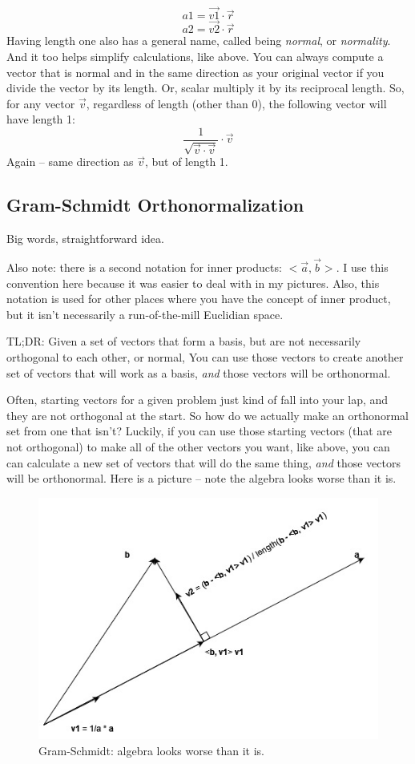 \documentclass[
]{book}
\begin{document}
\[a1 = \vec{v1}\cdot\vec{r}\]
\[a2 = \vec{v2}\cdot\vec{r}\]
Having length one also has a general name, called being \emph{normal}, or \emph{normality}. And it too helps simplify calculations, like above. You can always compute a vector that is normal and in the same direction as your original vector if you divide the vector by its length. Or, scalar multiply it by its reciprocal length. So, for any vector \(\vec{v}\), regardless of length (other than 0), the following vector will have length 1:
\[\frac{1}{\sqrt{\vec{v}\cdot\vec{v}}}\cdot\vec{v}\]
Again -- same direction as \(\vec{v}\), but of length 1.

\hypertarget{gram-schmidt-orthonormalization}{%
\subsection{Gram-Schmidt Orthonormalization}\label{gram-schmidt-orthonormalization}}

Big words, straightforward idea.

Also note: there is a second notation for inner products: \(<\vec{a},\vec{b}>\). I use this convention here because it was easier to deal with in my pictures. Also, this notation is used for other places where you have the concept of inner product, but it isn't necessarily a run-of-the-mill Euclidian space.

TL;DR: Given a set of vectors that form a basis, but are not necessarily orthogonal to each other, or normal, You can use those vectors to create another set of vectors that will work as a basis, \emph{and} those vectors will be orthonormal.

Often, starting vectors for a given problem just kind of fall into your lap, and they are not orthogonal at the start. So how do we actually make an orthonormal set from one that isn't? Luckily, if you can use those starting vectors (that are not orthogonal) to make all of the other vectors you want, like above, you can can calculate a new set of vectors that will do the same thing, \emph{and} those vectors will be orthonormal. Here is a picture -- note the algebra looks worse than it is.

\begin{figure}

{\centering \includegraphics[width=0.75\linewidth,height=0.75\textheight]{images/gram-schmidt} 

}

\caption{Gram-Schmidt: algebra looks worse than it is.}\label{fig:unnamed-chunk-5}
\end{figure}
\end{document}
